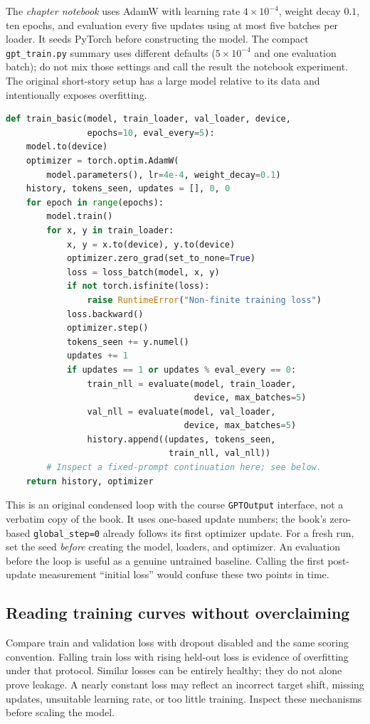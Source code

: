 The \emph{chapter notebook} uses AdamW with learning rate $4\times10^{-4}$,
weight decay $0.1$, ten epochs, and evaluation every five updates using at most
five batches per loader. It seeds PyTorch before constructing the model.
The compact \texttt{gpt\_train.py} summary uses different defaults
($5\times10^{-4}$ and one evaluation batch); do not mix those settings and call
the result the notebook experiment. The original short-story setup has a large
model relative to its data and intentionally exposes overfitting.

\begin{lstlisting}[language=Python]
def train_basic(model, train_loader, val_loader, device,
                epochs=10, eval_every=5):
    model.to(device)
    optimizer = torch.optim.AdamW(
        model.parameters(), lr=4e-4, weight_decay=0.1)
    history, tokens_seen, updates = [], 0, 0
    for epoch in range(epochs):
        model.train()
        for x, y in train_loader:
            x, y = x.to(device), y.to(device)
            optimizer.zero_grad(set_to_none=True)
            loss = loss_batch(model, x, y)
            if not torch.isfinite(loss):
                raise RuntimeError("Non-finite training loss")
            loss.backward()
            optimizer.step()
            tokens_seen += y.numel()
            updates += 1
            if updates == 1 or updates % eval_every == 0:
                train_nll = evaluate(model, train_loader,
                                     device, max_batches=5)
                val_nll = evaluate(model, val_loader,
                                   device, max_batches=5)
                history.append((updates, tokens_seen,
                                train_nll, val_nll))
        # Inspect a fixed-prompt continuation here; see below.
    return history, optimizer
\end{lstlisting}
This is an original condensed loop with the course \texttt{GPTOutput} interface,
not a verbatim copy of the book. It uses one-based update numbers; the book's
zero-based \texttt{global\_step=0} already follows its first optimizer update.
For a fresh run, set the seed \emph{before} creating the model, loaders, and
optimizer. An evaluation before the loop is useful as a genuine untrained
baseline. Calling the first post-update measurement ``initial loss'' would
confuse these two points in time.

\subsection{Reading training curves without overclaiming}
Compare train and validation loss with dropout disabled and the same scoring
convention. Falling train loss with rising held-out loss is evidence of
overfitting under that protocol. Similar losses can be entirely healthy; they
do not alone prove leakage. A nearly constant loss may reflect an incorrect
target shift, missing updates, unsuitable learning rate, or too little training.
Inspect these mechanisms before scaling the model.

